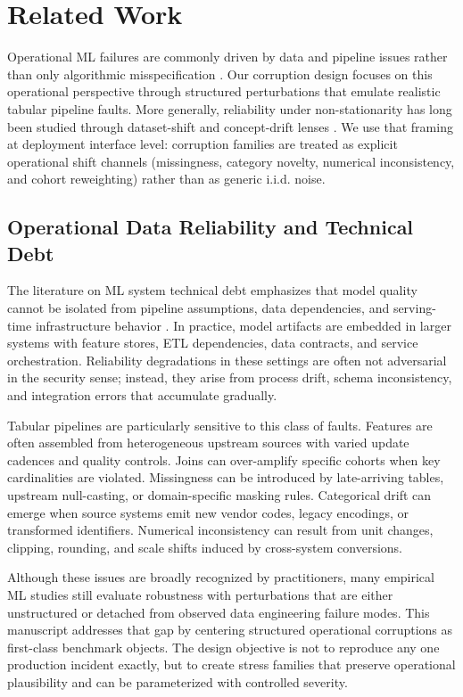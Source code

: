 \documentclass{AuthorGuide/ijitcs}
\begin{document}
\section{Related Work}
Operational ML failures are commonly driven by data and pipeline issues rather than only algorithmic misspecification \cite{sculley2015hidden}. Our corruption design focuses on this operational perspective through structured perturbations that emulate realistic tabular pipeline faults.
More generally, reliability under non-stationarity has long been studied through dataset-shift and concept-drift lenses \cite{quionero2009datasetshift,moreno2012datasetshift,gama2014conceptdrift}. We use that framing at deployment interface level: corruption families are treated as explicit operational shift channels (missingness, category novelty, numerical inconsistency, and cohort reweighting) rather than as generic i.i.d. noise.

\subsection{Operational Data Reliability and Technical Debt}
The literature on ML system technical debt emphasizes that model quality cannot be isolated from pipeline assumptions, data dependencies, and serving-time infrastructure behavior \cite{sculley2015hidden}. In practice, model artifacts are embedded in larger systems with feature stores, ETL dependencies, data contracts, and service orchestration. Reliability degradations in these settings are often not adversarial in the security sense; instead, they arise from process drift, schema inconsistency, and integration errors that accumulate gradually.

Tabular pipelines are particularly sensitive to this class of faults. Features are often assembled from heterogeneous upstream sources with varied update cadences and quality controls. Joins can over-amplify specific cohorts when key cardinalities are violated. Missingness can be introduced by late-arriving tables, upstream null-casting, or domain-specific masking rules. Categorical drift can emerge when source systems emit new vendor codes, legacy encodings, or transformed identifiers. Numerical inconsistency can result from unit changes, clipping, rounding, and scale shifts induced by cross-system conversions.

Although these issues are broadly recognized by practitioners, many empirical ML studies still evaluate robustness with perturbations that are either unstructured or detached from observed data engineering failure modes. This manuscript addresses that gap by centering structured operational corruptions as first-class benchmark objects. The design objective is not to reproduce any one production incident exactly, but to create stress families that preserve operational plausibility and can be parameterized with controlled severity.
\end{document}
